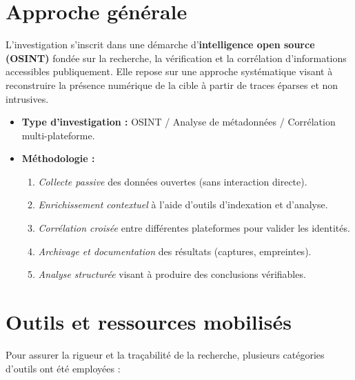 \documentclass[a4paper,12pt]{report}
\begin{document}
\section{Approche générale}

L’investigation s’inscrit dans une démarche d’\textbf{intelligence open source (OSINT)} fondée sur la recherche, la vérification et la corrélation d’informations accessibles publiquement.  
Elle repose sur une approche systématique visant à reconstruire la présence numérique de la cible à partir de traces éparses et non intrusives.

\begin{itemize}
	\item \textbf{Type d’investigation :} OSINT / Analyse de métadonnées / Corrélation multi-plateforme.
	\item \textbf{Méthodologie :} 
	\begin{enumerate}
		\item \textit{Collecte passive} des données ouvertes (sans interaction directe).
		\item \textit{Enrichissement contextuel} à l’aide d’outils d’indexation et d’analyse.
		\item \textit{Corrélation croisée} entre différentes plateformes pour valider les identités.
		\item \textit{Archivage et documentation} des résultats (captures, empreintes).
		\item \textit{Analyse structurée} visant à produire des conclusions vérifiables.
	\end{enumerate}
\end{itemize}

\section{Outils et ressources mobilisés}

Pour assurer la rigueur et la traçabilité de la recherche, plusieurs catégories d’outils ont été employées :
\end{document}
